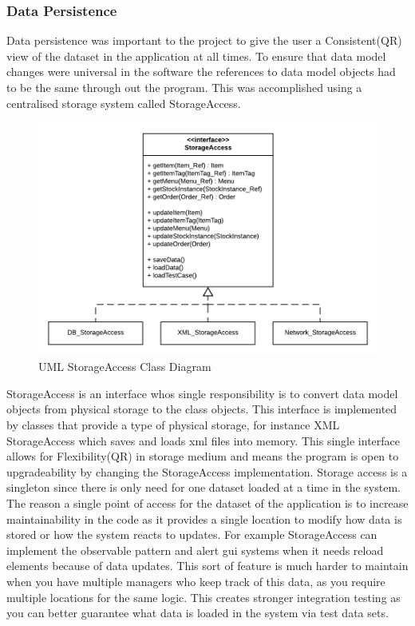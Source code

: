 \pagebreak

\subsubsection{Data Persistence}
Data persistence was important to the project to give the user a Consistent(QR) view of the dataset in the application at all times. To ensure that data model changes were universal in the software the references to data model objects had to be the same through out the program. This was accomplished using a centralised storage system called StorageAccess. 

\begin{figure}[h]
	\centering
	\includegraphics[width=.75\linewidth]{images/data_model/storage.png}
	\caption{UML StorageAccess Class Diagram}
\end{figure}

StorageAccess is an interface whos single responsibility is to convert data model objects from physical storage to the class objects. This interface is implemented by classes that provide a type of physical storage, for instance XML StorageAccess which saves and loads xml files into memory. This single interface allows for Flexibility(QR) in storage medium and means the program is open to upgradeability by changing the StorageAccess implementation. Storage access is a singleton since there is only need for one dataset loaded at a time in the system. The reason a single point of access for the dataset of the application is to increase maintainability in the code as it provides a single location to modify how data is stored or how the system reacts to updates. For example StorageAccess can implement the observable pattern and alert gui systems when it needs reload elements because of data updates. This sort of feature is much harder to maintain when you have multiple managers who keep track of this data, as you require multiple locations for the same logic. This creates stronger integration testing as you can better guarantee what data is loaded in the system via test data sets.

